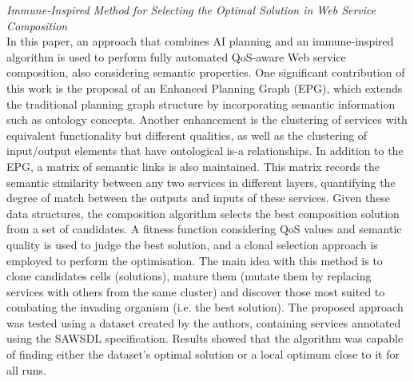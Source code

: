 \textit{Immune-Inspired Method for Selecting the Optimal Solution in Web Service Composition \cite{pop2010immune}}\\
In this paper, an approach that combines AI planning and an immune-inspired algorithm is used to perform fully automated QoS-aware Web service composition, also considering
semantic properties. One significant contribution of this work is the proposal of an Enhanced Planning Graph (EPG), which extends the traditional planning graph structure
by incorporating semantic information such as ontology concepts. Another enhancement is the clustering of services with equivalent functionality but different qualities, as
well as the clustering of input/output elements that have ontological is-a relationships. In addition to the EPG, a matrix of semantic links is also maintained. This matrix
records the semantic similarity between any two services in different layers, quantifying the degree of match between the outputs and inputs of these services. Given these
data structures, the composition algorithm selects the best composition solution from a set of candidates. A fitness function considering QoS values and semantic quality
is used to judge the best solution, and a clonal selection approach is employed to perform the optimisation. The main idea with this method is to clone candidates cells (solutions),
mature them (mutate them by replacing services with others from the same cluster) and discover those most suited to combating the invading organism (i.e. the best solution).
The proposed approach was tested using a dataset created by the authors, containing services annotated using the SAWSDL specification. Results showed that the algorithm
was capable of finding either the dataset's optimal solution or a local optimum close to it for all runs.

